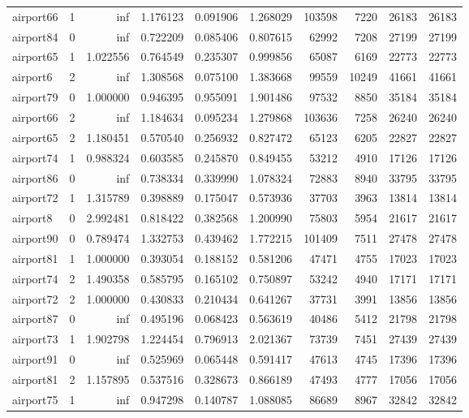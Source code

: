 \begin{longtable}{|l|r|r|r|r|r|r|r|r|r|}
airport66 & 1 & inf & 1.176123 & 0.091906 & 1.268029 & 103598 & 7220 & 26183 & 26183 \\
airport84 & 0 & inf & 0.722209 & 0.085406 & 0.807615 & 62992 & 7208 & 27199 & 27199 \\
airport65 & 1 & 1.022556 & 0.764549 & 0.235307 & 0.999856 & 65087 & 6169 & 22773 & 22773 \\
airport6 & 2 & inf & 1.308568 & 0.075100 & 1.383668 & 99559 & 10249 & 41661 & 41661 \\
airport79 & 0 & 1.000000 & 0.946395 & 0.955091 & 1.901486 & 97532 & 8850 & 35184 & 35184 \\
airport66 & 2 & inf & 1.184634 & 0.095234 & 1.279868 & 103636 & 7258 & 26240 & 26240 \\
airport65 & 2 & 1.180451 & 0.570540 & 0.256932 & 0.827472 & 65123 & 6205 & 22827 & 22827 \\
airport74 & 1 & 0.988324 & 0.603585 & 0.245870 & 0.849455 & 53212 & 4910 & 17126 & 17126 \\
airport86 & 0 & inf & 0.738334 & 0.339990 & 1.078324 & 72883 & 8940 & 33795 & 33795 \\
airport72 & 1 & 1.315789 & 0.398889 & 0.175047 & 0.573936 & 37703 & 3963 & 13814 & 13814 \\
airport8 & 0 & 2.992481 & 0.818422 & 0.382568 & 1.200990 & 75803 & 5954 & 21617 & 21617 \\
airport90 & 0 & 0.789474 & 1.332753 & 0.439462 & 1.772215 & 101409 & 7511 & 27478 & 27478 \\
airport81 & 1 & 1.000000 & 0.393054 & 0.188152 & 0.581206 & 47471 & 4755 & 17023 & 17023 \\
airport74 & 2 & 1.490358 & 0.585795 & 0.165102 & 0.750897 & 53242 & 4940 & 17171 & 17171 \\
airport72 & 2 & 1.000000 & 0.430833 & 0.210434 & 0.641267 & 37731 & 3991 & 13856 & 13856 \\
airport87 & 0 & inf & 0.495196 & 0.068423 & 0.563619 & 40486 & 5412 & 21798 & 21798 \\
airport73 & 1 & 1.902798 & 1.224454 & 0.796913 & 2.021367 & 73739 & 7451 & 27439 & 27439 \\
airport91 & 0 & inf & 0.525969 & 0.065448 & 0.591417 & 47613 & 4745 & 17396 & 17396 \\
airport81 & 2 & 1.157895 & 0.537516 & 0.328673 & 0.866189 & 47493 & 4777 & 17056 & 17056 \\
airport75 & 1 & inf & 0.947298 & 0.140787 & 1.088085 & 86689 & 8967 & 32842 & 32842 \\

\end{longtable}
